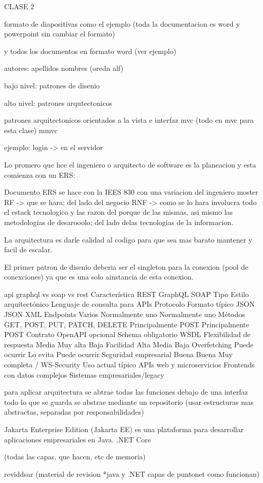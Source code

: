 CLASE 2

formato de diapositivas como el ejemplo (toda la documentacion es word y powerpoint sin cambiar el formato)

y todos los documentos en formato word (ver ejemplo)

autores:
apellidos nombres (oredn alf)


bajo nivel:
patrones de disenio 




alto nivel:
patrones arqutectonicos


patrones arquitectonicos orientados a la vista e interfaz
mvc (todo en mvc para esta clase)
mmvc

ejemplo:
login -> en el servidor

Lo promero que hce el ingeniero o arquitecto de software es la planeacion y esta comienza con un ERS:

Documento ERS se hace con la IEES 830 con una variacion del ingeniero moster
RF -> que se hara; del lado del negocio
RNF -> como se lo hara involucra todo el estack tecnologico y las razon del porque de las mismas, asi mismo las metodologias de desarooolo;
   del lado delas tecnologias de la informacion. 

La arquitectura es darle calidad al codigo para que sea mas barato mantener y facil de escalar.

El primer patron de disenio deberia ser el singleton para la conexion (pool de conexciones) ya que es una solo ainstancia 
de esta conexion. 

api graphql vs soap vs rest
Característica	REST	GraphQL	SOAP
Tipo	Estilo arquitectónico	Lenguaje de consulta para APIs	Protocolo
Formato típico	JSON	JSON	XML
Endpoints	Varios	Normalmente uno	Normalmente uno
Métodos	GET, POST, PUT, PATCH, DELETE	Principalmente POST	Principalmente POST
Contrato	OpenAPI opcional	Schema obligatorio	WSDL
Flexibilidad de respuesta	Media	Muy alta	Baja
Facilidad	Alta	Media	Baja
Overfetching	Puede ocurrir	Lo evita	Puede ocurrir
Seguridad empresarial	Buena	Buena	Muy completa / WS-Security
Uso actual típico	APIs web y microservicios	Frontends con datos complejos	Sistemas empresariales/legacy

para aplicar arquitectura se abtrae todas las funciones debajo de una interfaz
todo lo que se guarda se abstrae mediante un repositorio
(usar estructuras mas abstractas, separadas por responsabilidades)

Jakarta Enterprise Edition (Jakarta EE) es una plataforma para desarrollar aplicaciones empresariales en Java.
.NET Core

(todas las capas, que hacen, etc de memoria)

reviddsar (material de revision *java y .NET  capas de puntonet como funcionan)
